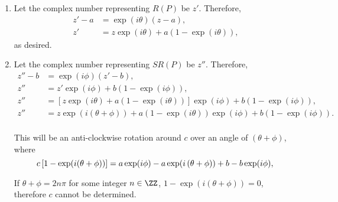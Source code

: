 \Question{\currfilebase}

\begin{enumerate}
    \item Let the complex number representing \(R(P)\) be \(z'\). Therefore,
          \begin{align*}
              z' - a & = \exp(i\theta) (z - a),                   \\
              z'     & = z \exp(i\theta) + a (1 - \exp(i\theta)),
          \end{align*}
          as desired.

    \item Let the complex number representing \(SR(P)\) be \(z''\). Therefore,
          \begin{align*}
              z'' - b & = \exp(i\phi) (z' - b),                                                                            \\
              z''     & = z' \exp(i\phi) + b(1 - \exp(i\phi)),                                                             \\
              z''     & = \left[z \exp(i\theta) + a (1 - \exp(i\theta))\right] \exp(i\phi) + b(1 - \exp(i\phi)),           \\
              z''     & = z\exp(i\left(\theta + \phi\right)) + a (1 - \exp(i \theta)) \exp(i \phi) + b (1 - \exp(i \phi)). \\
          \end{align*}

          This will be an anti-clockwise rotation around \(c\) over an angle of \((\theta + \phi)\), where
          \[
              c \left[1 - \exp(i (\theta + \phi))\right] = a \exp(i \phi) - a\exp(i \left(\theta + \phi\right)) + b - b \exp(i \phi),\\
          \]

          If \(\theta + \phi = 2n\pi\) for some integer \(n \in \ZZ\), \(1 - \exp(i (\theta + \phi)) = 0\), therefore \(c\) cannot be determined.


\end{enumerate}
